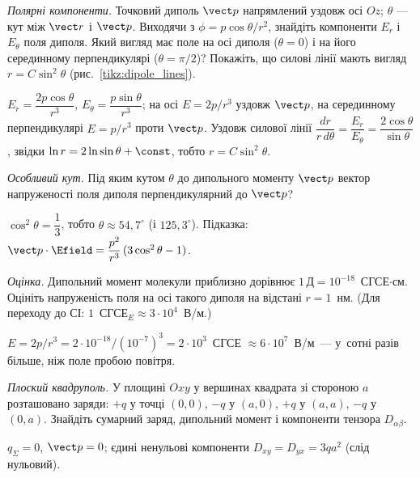 
\begin{problem}\label{prb:DipolePolar}
	\emph{Полярні компоненти.}
	Точковий диполь $\vect p$ напрямлений уздовж осі $Oz$; $\theta$ --- кут між $\vect r$ і $\vect p$. Виходячи з $\phi = p\cos\theta/r^2$, знайдіть компоненти $E_r$ і $E_\theta$ поля диполя. Який вигляд має поле на осі диполя ($\theta=0$) і на його серединному перпендикулярі ($\theta=\pi/2$)? Покажіть, що силові лінії мають вигляд $r = C\sin^2\theta$ (рис.~\ref{tikz:dipole_lines}).
	\begin{solution}
		$E_r=\dfrac{2p\cos\theta}{r^3}$, $E_\theta=\dfrac{p\sin\theta}{r^3}$; на осі $E=2p/r^3$ уздовж $\vect p$, на серединному перпендикулярі $E=p/r^3$ проти $\vect p$. Уздовж силової лінії $\dfrac{dr}{r\,d\theta}=\dfrac{E_r}{E_\theta}=\dfrac{2\cos\theta}{\sin\theta}$, звідки $\ln r = 2\ln\sin\theta + \const$, тобто $r = C\sin^2\theta$.
	\end{solution}
\end{problem}

\begin{problem}\label{prb:DipoleMagicAngle}
	\emph{Особливий кут.} 
	Під яким кутом $\theta$ до дипольного моменту $\vect p$ вектор напруженості поля диполя перпендикулярний до $\vect p$?
	\begin{solution}
		$\cos^2\theta=\dfrac13$, тобто $\theta\approx54{,}7^\circ$ (і $125{,}3^\circ$). Підказка: $\vect p\cdot\Efield=\dfrac{p^2}{r^3}\,(3\cos^2\theta-1)$.
	\end{solution}
\end{problem}

\begin{problem}\label{prb:DipoleHClEstimate}
	\emph{Оцінка.}
	Дипольний момент молекули  приблизно дорівнює $1\,\text{Д}=10^{-18}$~СГСЕ$\cdot$см. Оцініть напруженість поля на осі такого диполя на відстані $r=1$~нм. (Для переходу до СІ: $1$~СГСЕ$_E\approx3\cdot10^{4}$~В/м.)
	\begin{solution}
		$E=2p/r^3=2\cdot10^{-18}/(10^{-7})^3=2\cdot10^{3}$~СГСЕ $\approx6\cdot10^{7}$~В/м~--- у~сотні разів більше, ніж поле пробою повітря.
	\end{solution}
\end{problem}


\begin{problem}\label{prb:SquareQuadrupole}
	\emph{Плоский квадруполь.}
	У площині $Oxy$ у вершинах квадрата зі стороною $a$ розташовано заряди: $+q$ у точці $(0,0)$, $-q$ у $(a,0)$, $+q$ у $(a,a)$, $-q$ у $(0,a)$. Знайдіть сумарний заряд, дипольний момент і компоненти тензора $D_{\alpha\beta}$.
	\begin{solution}
		$q_\Sigma=0$, $\vect p=0$; єдині ненульові компоненти $D_{xy}=D_{yx}=3qa^2$ (слід нульовий).
	\end{solution}
\end{problem}

